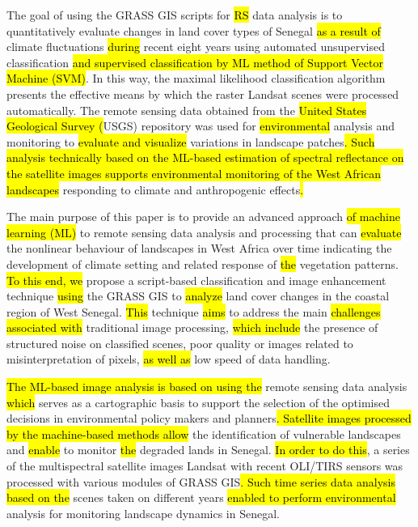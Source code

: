 \documentclass[earth,article,submit,pdftex,moreauthors]{Definitions/mdpi}
\begin{document}
The goal of using the GRASS GIS scripts for \hl{RS} data analysis is to quantitatively evaluate changes in land cover types of Senegal \hl{as a result of} climate fluctuations \hl{during} recent eight years using automated unsupervised classification \hl{and supervised classification by ML method of Support Vector Machine (SVM)}. In this way, the maximal likelihood classification algorithm presents the effective means by which the raster Landsat scenes were processed automatically. The remote sensing data obtained from the \hl{United States Geological Survey (}USGS) repository was used for \hl{environmental }analysis and\hl{ }monitoring to \hl{evaluate and visualize} variations in landscape patches\hl{. Such analysis technically based on the ML-based estimation of spectral reflectance on the satellite images supports environmental monitoring of the West African landscapes} responding to climate and anthropogenic effects\hl{.} 

The main purpose of this paper is to provide an advanced approach \hl{of machine learning (ML) }to remote sensing data analysis and processing that can \hl{evaluate} the nonlinear behaviour of landscapes in West Africa over time indicating the development of climate setting and\hl{ }related response of \hl{the} vegetation patterns. \hl{To this end, we} propose a script-based classification and image enhancement technique \hl{using} the GRASS GIS to \hl{analyze} land cover changes in the coastal region of West Senegal. \hl{This} technique \hl{aims} to address the main \hl{challenges associated with} traditional image processing, \hl{which include} the presence of structured noise on classified scenes, poor quality or images related to misinterpretation of pixels, \hl{as well as} low speed of data handling. 

\hl{The ML-based image analysis is based on using the }remote sensing data analysis \hl{which }serves as a cartographic basis to support the selection of the optimised decisions in environmental policy makers and planners\hl{. Satellite images processed by the machine-based methods allow }the identification of vulnerable landscapes and \hl{enable} to monitor \hl{the }degraded lands in Senegal. \hl{In order to do this}, a series of the multispectral satellite images Landsat with recent OLI/TIRS sensors was processed with various modules of GRASS GIS\hl{. Such time series data analysis based on the} scenes taken on different years \hl{enabled to perform environmental } analysis for monitoring landscape dynamics in Senegal. 
\end{document}
